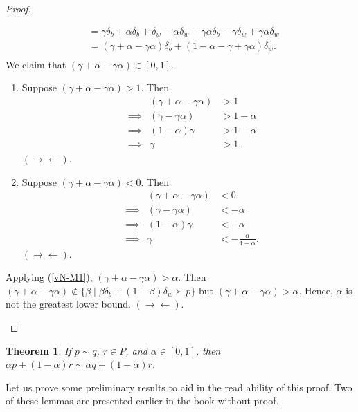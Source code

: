 \documentclass[12pt]{article}
\newtheorem{thm}{Theorem}[section]
\theoremstyle{definition}
\theoremstyle{remark}
\def\contra{\rightarrow \leftarrow}
\begin{document}
\begin{proof}
\begin{enumerate}
\begin{enumerate}
\begin{align*}
        &= \gamma \delta_b + \alpha \delta_b + \delta_w - \alpha \delta_w - \gamma \alpha \delta_b - \gamma \delta_w + \gamma \alpha \delta_w \\
        &= (\gamma + \alpha - \gamma \alpha) \delta_b + (1 - \alpha - \gamma + \gamma \alpha)\delta_w. \\
      \end{align*}
      We claim that $(\gamma + \alpha - \gamma \alpha) \in [0,1]$.
      \begin{enumerate}
        \item Suppose $(\gamma + \alpha - \gamma \alpha) > 1$. Then
        \begin{align*}
          &           & (\gamma + \alpha - \gamma \alpha) &> 1 \\
          & \implies  & (\gamma - \gamma \alpha) &> 1 - \alpha \\
          & \implies  & (1 - \alpha)\gamma &> 1 - \alpha \\
          & \implies  & \gamma &> 1.
        \end{align*}
        $(\contra)$.
        \item Suppose $(\gamma + \alpha - \gamma \alpha) < 0$. Then
        \begin{align*}
          &          & (\gamma + \alpha - \gamma \alpha) &< 0 \\
          & \implies & (\gamma - \gamma \alpha) &< -\alpha \\
          & \implies & (1 - \alpha)\gamma &< -\alpha \\
          & \implies & \gamma &< -\frac{\alpha}{1 - \alpha}.
        \end{align*}
        $(\contra)$.
      \end{enumerate}
      Applying (\ref{vN-M1}), $(\gamma + \alpha - \gamma \alpha) > \alpha$. Then $(\gamma + \alpha - \gamma \alpha) \not \in \{ \beta \mid \beta \delta_b + (1 - \beta) \delta_w \succ p \}$ but $(\gamma + \alpha - \gamma \alpha) > \alpha$.
      Hence, $\alpha$ is not the greatest lower bound. $(\contra)$.
    \end{enumerate}
  \end{enumerate}
\end{proof}
%
%
\begin{thm}\label{lemma 3}
  If $p \sim q$, $r \in P$, and $\alpha \in [0,1]$, then $\alpha p + (1 - \alpha)r \sim \alpha q + (1 - \alpha)r$.
\end{thm}
\noindent Let us prove some preliminary results to aid in the read ability of this proof. Two of these lemmas are presented earlier in the book without proof.
\end{document}
